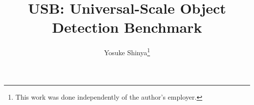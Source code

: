\documentclass[10pt,twocolumn,letterpaper]{article}
\newcommand{\Mangas}{Manga109-s\xspace}
\begin{document}
\title{USB: Universal-Scale Object Detection Benchmark}

\author{Yosuke Shinya\thanks{This work was done independently of the author's employer.}
}

\makeatletter
\let\@oldmaketitle\@maketitle \renewcommand{\@maketitle}{\@oldmaketitle \vspace{-5mm}
	\begin{center}
		\begin{minipage}[b]{0.32\hsize}
			\centering
			\texttt{[image: images/coco\_keybowl.jpg]}
			\label{fig:teaser_a}
		\end{minipage}
		\hfill
		\begin{minipage}[b]{0.339540508\hsize}
			\centering
			\texttt{[image: images/00079\_00120\_camera1\_.jpg]}
			\label{fig:teaser_b}
		\end{minipage}
		\hfill
		\begin{minipage}[b]{0.32\hsize}
			\centering
			\begin{overpic}[width=\textwidth]{images/HinagikuKenzan_026.jpg}
				\put( 30, -1.5){\scriptsize{Hinagiku Kenzan\textit{!} \copyright Minene Sakurano}}
			\end{overpic}
			\label{fig:teaser_c}
		\end{minipage}
		\vspace{-3mm}
		\captionof{figure}{
			Universal-scale object detection.
			For realizing human-level perception,
			object detection systems must detect both tiny and large objects,
			even if they are out of natural image domains.
			To this end,
			we introduce the \textit{Universal-Scale object detection Benchmark (USB)} that
			consists of the COCO dataset (left), Waymo Open Dataset (middle), and \Mangas dataset (right).
		}
		\label{fig:teaser}
	\end{center}
	\bigskip}
\makeatother

\maketitle
\end{document}
